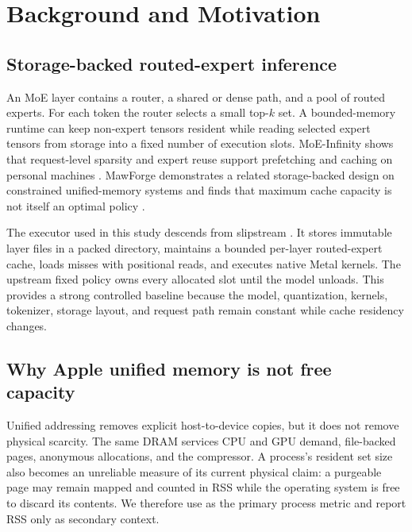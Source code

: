 \section{Background and Motivation}
\label{sec:background}

\subsection{Storage-backed routed-expert inference}

An MoE layer contains a router, a shared or dense path, and a pool of routed
experts. For each token the router selects a small top-$k$ set. A bounded-memory
runtime can keep non-expert tensors resident while reading selected expert
tensors from storage into a fixed number of execution slots. MoE-Infinity shows
that request-level sparsity and expert reuse support prefetching and caching on
personal machines \cite{xue2024moeinfinity}. MawForge demonstrates a related
storage-backed design on constrained unified-memory systems and finds that
maximum cache capacity is not itself an optimal policy \cite{opie2026mawforge}.

The executor used in this study descends from slipstream
\cite{patel2026slipstream}. It stores immutable layer files in a packed
 directory, maintains a bounded per-layer routed-expert cache,
loads misses with positional reads, and executes native Metal kernels. The
upstream fixed policy owns every allocated slot until the model unloads. This
provides a strong controlled baseline because the model, quantization, kernels,
tokenizer, storage layout, and request path remain constant while cache
residency changes.

\subsection{Why Apple unified memory is not free capacity}

Unified addressing removes explicit host-to-device copies, but it does not
remove physical scarcity. The same DRAM services CPU and GPU demand, file-backed
pages, anonymous allocations, and the compressor. A process's resident set size
also becomes an unreliable measure of its current physical claim: a purgeable
page may remain mapped and counted in RSS while the operating system is free to
discard its contents. We therefore use 
as the primary process metric and report RSS only as secondary context.

